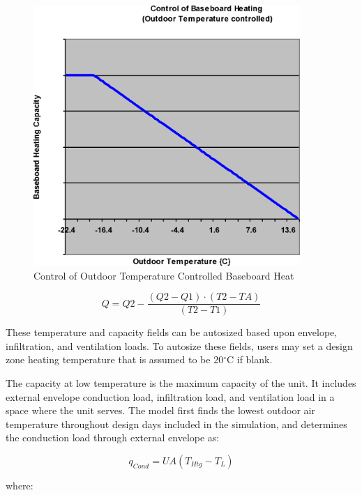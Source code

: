 \begin{figure}[hbtp] %
\centering
\includegraphics[width=0.9\textwidth, height=0.9\textheight, keepaspectratio=true]{media/image5821.png}
\caption{Control of Outdoor Temperature Controlled Baseboard Heat \protect \label{fig:control-of-outdoor-temperature-controlled}}
\end{figure}

\begin{equation}
Q = Q2 - \frac{{(Q2 - Q1)\cdot (T2 - TA)}}{{(T2 - T1)}}
\end{equation}

These temperature and capacity fields can be autosized based upon envelope, infiltration, and ventilation loads. To autosize these fields, users may set a design zone heating temperature that is assumed to be 20\(^{\circ}\)C if blank.

The capacity at low temperature is the maximum capacity of the unit. It includes external envelope conduction load, infiltration load, and ventilation load in a space where the unit serves. The model first finds the lowest outdoor air temperature throughout design days included in the simulation, and determines the conduction load through external envelope as:

\begin{equation}
{q_{Cond}} = UA\left( {{T_{Htg}} - {T_L}} \right)
\end{equation}

where:

